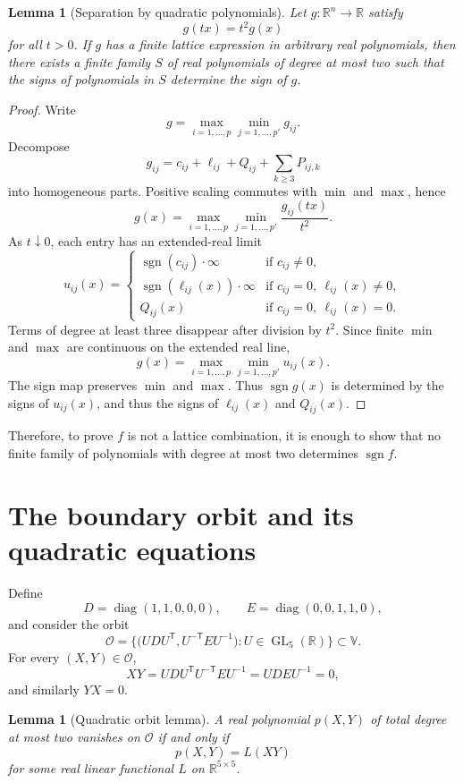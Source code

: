 \documentclass[11pt]{amsart}
\newtheorem{lemma}[theorem]{Lemma}
\theoremstyle{remark}
\DeclareMathOperator{\GL}{GL}
\DeclareMathOperator{\diag}{diag}
\DeclareMathOperator{\sgn}{sgn}
\newcommand{\tp}{{\scriptscriptstyle\mathsf{T}}}
\begin{document}
\begin{lemma}[Separation by quadratic polynomials]
Let $g:\mathbb R^n\to\mathbb R$ satisfy
\[
g(tx)=t^2g(x)
\]
for all $t>0$. 
If $g$ has a finite lattice expression in arbitrary real polynomials, then there exists a finite family $S$ of real polynomials of degree at most two such that the signs of polynomials in $S$ determine the sign of $g$.
\end{lemma}
\begin{proof}
Write
\[
g=\max_{i=1,\dots,p}\min_{j=1,\dots,p'} g_{ij}.
\]
Decompose
\[
g_{ij}=c_{ij}+\ell_{ij}+Q_{ij}+\sum_{k\ge3}P_{ij,k}
\]
into homogeneous parts. Positive scaling commutes with $\min$ and $\max$, hence
\[
g(x)=\max_{i=1,\dots,p}\min_{j=1,\dots,p'} \frac{g_{ij}(tx)}{t^2}.
\]
As $t\downarrow0$, each entry has an extended-real limit
\[
u_{ij}(x)=
\begin{cases}
\sgn(c_{ij})\cdot\infty&\text{if } c_{ij}\ne0,\\
\sgn(\ell_{ij}(x))\cdot\infty&\text{if } c_{ij}=0,\ \ell_{ij}(x)\ne0,\\
Q_{ij}(x)&\text{if } c_{ij}=0,\ \ell_{ij}(x)=0.
\end{cases}
\]
Terms of degree at least three disappear after division by $t^2$. Since finite $\min$ and $\max$ are continuous on the extended real line,
\[
g(x)=\max_{i=1,\dots,p}\min_{j=1,\dots,p'} u_{ij}(x).
\]
The sign map preserves $\min$ and $\max$. Thus $\sgn g(x)$ is determined by the signs of $u_{ij}(x)$, and thus the signs of $\ell_{ij}(x)$ and $Q_{ij}(x)$.
\end{proof}

Therefore, to prove $f$ is not a lattice combination, it is enough to show that no finite family of polynomials with degree at most two determines $\sgn f$.

\section{The boundary orbit and its quadratic equations}

Define
\[
D=\diag(1,1,0,0,0),
\qquad
E=\diag(0,0,1,1,0),
\]
and consider the orbit
\begin{equation}
\mathcal O=
\bigl\{
\bigl(UDU^\tp ,U^{-\tp} EU^{-1}\bigr):U\in\GL_5(\mathbb R)
\bigr\}\subset \mathbb{V}.
\label{eq:orbit}
\end{equation}
For every $(X,Y)\in\mathcal O$,
\[
XY=UDU^\tp U^{-\tp} EU^{-1}=UDEU^{-1}=0,
\]
and similarly $YX=0$.

\begin{lemma}[Quadratic orbit lemma]\label{lem:quadratic-orbit}
A real polynomial $p(X,Y)$ of total degree at most two vanishes on $\mathcal O$ if and only if
\[
p(X,Y)=L(XY)
\]
for some real linear functional $L$ on $\mathbb{R}^{5 \times 5}$.
\end{lemma}
\end{document}
